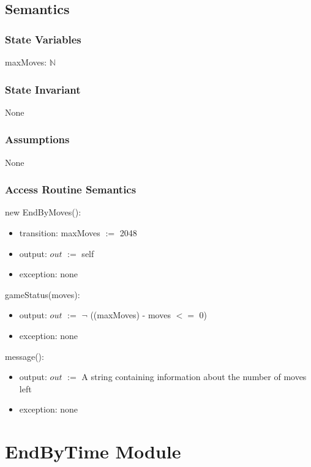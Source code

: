 \documentclass[12pt]{article}
\begin{document}
\subsection* {Semantics}

\subsubsection*{State Variables}

maxMoves: $\mathbb{N}$ 

\subsubsection*{State Invariant}

None

\subsubsection*{Assumptions}

None

\subsubsection* {Access Routine Semantics}

new EndByMoves():

\begin{itemize}
  \item transition: maxMoves $:=$ 2048
  \item output: $out$ $:=$ self
  \item exception: none
\end{itemize}

\noindent gameStatus(moves):

\begin{itemize}
  \item output: $out$ $:=$ $\lnot$ ((maxMoves) - moves $<=$ 0)
  \item exception: none
\end{itemize}

\noindent message():
\begin{itemize}
  \item output: $out$ $:=$ A string containing information about the number of moves left
  \item exception: none
\end{itemize}

\newpage

\section* {EndByTime Module}
\end{document}

